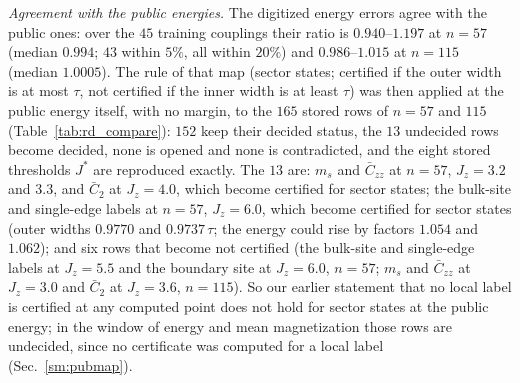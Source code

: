 \documentclass[aps,prx,onecolumn,10pt,nofootinbib,longbibliography,floatfix]{revtex4-2}
\theoremstyle{remark}
\newcommand{\Jz}{J_z}
\newcommand{\ms}{m_s}
\newcommand{\Czz}{\bar C_{zz}}
\newcommand{\Ctwo}{\bar C_{2}}
\begin{document}
\emph{Agreement with the public energies.} The digitized energy errors agree with the public ones: over the $45$
training couplings their ratio is $0.940$--$1.197$ at $n=57$ (median $0.994$; $43$ within $5\%$, all within $20\%$) %
and $0.986$--$1.015$ at $n=115$ (median $1.0005$). The rule of that map (sector states; certified if the outer %
width is at most $\tau$, not certified if the inner width is at least $\tau$) was then applied at the public energy
itself, with no margin, to the $165$ stored rows of $n=57$ and $115$ (Table~\ref{tab:rd_compare}): $152$ keep their %
decided status, the $13$ undecided rows become decided, none is opened and none is contradicted, and the eight %
stored thresholds $J^*$ are reproduced exactly. The $13$ are: $\ms$ and $\Czz$ at $n=57$, $\Jz=3.2$ and $3.3$, and %
$\Ctwo$ at $\Jz=4.0$, which become certified for sector states; the bulk-site and single-edge labels at $n=57$,
$\Jz=6.0$, which become certified for sector states (outer widths $0.9770$ and $0.9737\,\tau$; the energy could rise %
by factors $1.054$ and $1.062$); and six rows that become not certified (the bulk-site and single-edge labels at %
$\Jz=5.5$ and the boundary site at $\Jz=6.0$, $n=57$; $\ms$ and $\Czz$ at $\Jz=3.0$ and $\Ctwo$ at $\Jz=3.6$, $n=115$).
So our earlier statement that no local label is certified at any computed point does not hold for sector states at
the public energy; in the window of energy and mean magnetization those rows are undecided, since no certificate was
computed for a local label
(Sec.~\ref{sm:pubmap}).
\end{document}
